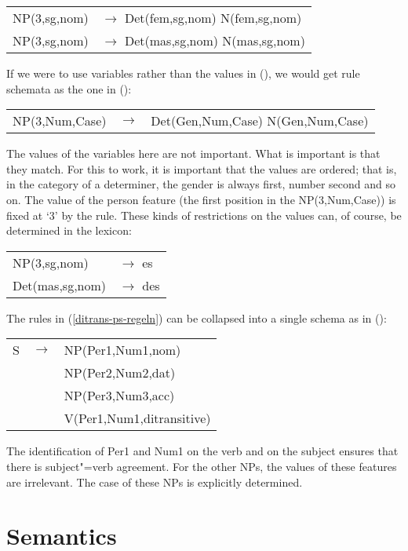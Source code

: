 \ea
\begin{tabular}[t]{@{}l@{ }l}
NP(3,sg,nom)  & $\to$ Det(fem,sg,nom) N(fem,sg,nom)\\
NP(3,sg,nom)  & $\to$ Det(mas,sg,nom) N(mas,sg,nom)\\
\end{tabular}
\z
If we were to use variables rather than the values in (), we would get rule schemata as the
one in ():
\ea
\label{Regel-mit-Variablen}
\begin{tabular}[t]{@{}l@{ }l@{ }l}
NP({3},{Num},{Case}) & $\to$ & Det(Gen,{Num},{Case}) N(Gen,{Num},{Case})\\
\end{tabular}
\z
The values of the variables here are not important. What is important is that they match. For this
to work, it is important that the values are ordered; that is, in the category of a determiner, the gender is always first, number
second and so on. The value of the person feature (the first position in the NP(3,Num,Case)) is fixed at `3' by the rule. These
kinds of restrictions on the values can, of course, be determined in the lexicon: 
\ea
\begin{tabular}[t]{@{}l@{ }l}
NP(3,sg,nom)  & $\to$ es\\
Det(mas,sg,nom)  & $\to$ des\\
\end{tabular}
\z

\noindent
The rules in (\ref{ditrans-ps-regeln})  can be collapsed into a single schema as in ():
\ea
\label{ditrans-schema}
\begin{tabular}[t]{@{}l@{ }l@{ }l}
S  & $\to$ & NP({Per1},{Num1},{nom}) \\
   &       & NP(Per2,Num2,{dat})\\
   &       & NP(Per3,Num3,{acc})\\
   &       & V({Per1},{Num1},ditransitive)\\
\end{tabular}
\z
The identification of Per1 and Num1 on the verb and on the subject ensures that there is subject"=verb agreement.
For the other NPs, the values of these features are irrelevant. The case of these NPs is explicitly determined.

\section{Semantics}
\label{sec-PSG-Semantik}

